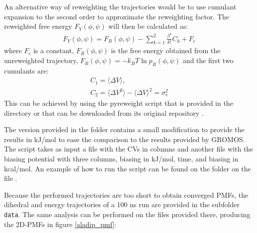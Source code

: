 An alternative way of reweighting the trajectories would be to use cumulant expansion to the second order to approximate the reweighting factor. The reweighted free energy  $F_{Y}(\phi, \psi)$ will then be calculated as:
\begin{equation}
  \begin{aligned}
 F_{Y}(\phi, \psi) = F_{R}(\phi, \psi) - \sum_{k=1}^{2} \frac{\beta^{k}}{k!}C_{k} + F_{c}
\end{aligned}
\end{equation}
where $F_{c}$ is a constant, $F_{R}(\phi, \psi)$ is the free energy obtained from the unreweighted trajectory, $F_{R}(\phi, \psi) = -k_{B}T \ln{p_{R}(\phi, \psi)}$ and the first two cumulants are:
\begin{equation}
  \begin{aligned}
C_{1} = \langle \Delta V \rangle,\\
C_{2} = \langle \Delta V^2 \rangle - \langle \Delta V \rangle^2 = \sigma^{2}_{v}
\end{aligned}
\end{equation}
This can be achieved by using the pyreweight script that is provided in the  directory or that can be downloaded from its original repository \cite{miao2014improved}.

The version provided in the  folder contains a small modification to provide the results in kJ/mol to ease the comparison to the results provided by GROMOS. The script takes as input a file with the CVs in columns and another file with the biasing potential with three columns, biasing in kJ/mol, time, and biasing in kcal/mol. An example of how to run the script can be found on the  folder on the file .

Because the performed trajectories are too short to obtain converged PMFs, the dihedral and energy trajectories of a 100 ns run are provided in the subfolder \texttt{data}. The same analysis can be performed on the files provided there, producing the 2D-PMFs in figure \ref{aladip_pmf}:


